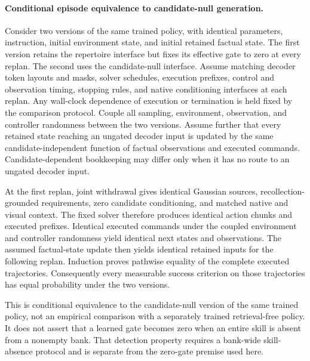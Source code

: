 \paragraph{Conditional episode equivalence to candidate-null generation.}
\label{app:candidate_null_episode_equivalence}
Consider two versions of the same trained policy, with identical parameters,
instruction, initial environment state, and initial retained factual state.
The first version retains the repertoire interface but fixes its effective
gate to zero at every replan. The second uses the candidate-null interface.
Assume matching decoder token layouts and masks, solver schedules, execution
prefixes, control and observation timing, stopping rules, and native
conditioning interfaces at each replan. Any wall-clock dependence of execution
or termination is held fixed by the comparison protocol. Couple all sampling, environment,
observation, and controller randomness between the two versions.
Assume further that every retained state reaching an ungated decoder input
is updated by the same candidate-independent function of factual observations
and executed commands. Candidate-dependent bookkeeping may differ only when
it has no route to an ungated decoder input.

At the first replan, joint withdrawal gives identical Gaussian sources,
recollection-grounded requirements, zero candidate conditioning, and matched
native and visual context. The fixed solver therefore produces identical
action chunks and executed prefixes. Identical executed commands under the
coupled environment and controller randomness yield identical next states
and observations. The assumed factual-state update then yields identical
retained inputs for the following replan. Induction proves pathwise equality
of the complete executed trajectories. Consequently every measurable success
criterion on those trajectories has equal probability under the two versions.

This is conditional equivalence to the candidate-null version of the same
trained policy, not an empirical comparison with a separately trained
retrieval-free policy. It does not assert that a learned gate becomes zero
when an entire skill is absent from a nonempty bank. That detection property
requires a bank-wide skill-absence protocol and is separate from the
zero-gate premise used here.
